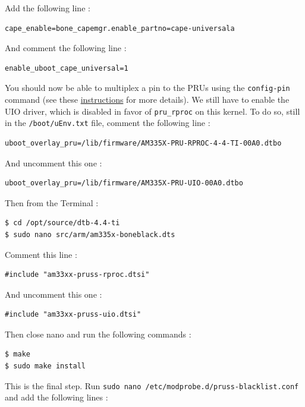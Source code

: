 \documentclass[]{report}
\begin{document}
\noindent Add the following line :

\begin{verbatim}
cape_enable=bone_capemgr.enable_partno=cape-universala
\end{verbatim}

\noindent And comment the following line :

\begin{verbatim}
enable_uboot_cape_universal=1
\end{verbatim}

You should now be able to multiplex a pin to the PRUs using the
\texttt{config-pin} command (see these
\href{Documentation/pins.md}{instructions} for more details). We still
have to enable the UIO driver, which is disabled in favor of
\texttt{pru\_rproc} on this kernel. To do so, still in the
\texttt{/boot/uEnv.txt} file, comment the following line :

\begin{verbatim}
uboot_overlay_pru=/lib/firmware/AM335X-PRU-RPROC-4-4-TI-00A0.dtbo
\end{verbatim}

\noindent And uncomment this one :

\begin{verbatim}
uboot_overlay_pru=/lib/firmware/AM335X-PRU-UIO-00A0.dtbo
\end{verbatim}

\noindent Then from the Terminal :

\begin{verbatim}
$ cd /opt/source/dtb-4.4-ti
$ sudo nano src/arm/am335x-boneblack.dts
\end{verbatim}

\noindent Comment this line :

\begin{verbatim}
#include "am33xx-pruss-rproc.dtsi"
\end{verbatim}

\noindent And uncomment this one :

\begin{verbatim}
#include "am33xx-pruss-uio.dtsi"
\end{verbatim}

\noindent Then close nano and run the following commands :

\begin{verbatim}
$ make
$ sudo make install
\end{verbatim}

\noindent This is the final step. Run
\texttt{sudo\ nano\ /etc/modprobe.d/pruss-blacklist.conf} and add the
following lines :
\end{document}
